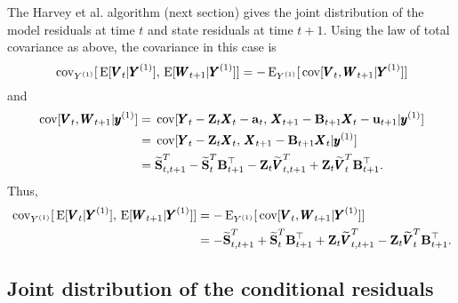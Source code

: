 \documentclass[]{article}
\def\UPS{\mbox{\boldmath $\Upsilon$}}
\def\XI{\mbox{\boldmath $\Xi$}}
\def\BB{\mbox{$\mathbf B$}}	\def\bb{\mbox{$\mathbf b$}} \def\Bb{\mbox{$\mathbf J$}} \def\Ba{\mbox{$\mathbf L$}} \def\Bm{\UPS}
\def\E{\,\textup{\textrm{E}}}
\def\Ss{\mbox{$\mathbf S$}}
\def\VV{\mbox{$\pmb{V}$}}	\def\vv{\mbox{$\pmb{v}$}}
\def\WW{\mbox{$\pmb{W}$}}	\def\ww{\mbox{$\pmb{w}$}}
\def\XX{\mbox{$\pmb{X}$}}	\def\xx{\mbox{$\pmb{x}$}}
\def\YY{\mbox{$\pmb{Y}$}}	\def\yy{\mbox{$\pmb{y}$}}
\def\ZZ{\mbox{$\mathbf Z$}}	\def\zz{\mbox{$\mathbf z$}}	\def\Zb{\mbox{$\mathbf M$}} \def\Za{\mbox{$\mathbf N$}} \def\Zm{\XI}
\def\cov{\,\textup{\textrm{cov}}}
\def\hatVtT{\widetilde{\VV}_t^T}
\def\hatVttpT{\widetilde{\VV}_{t,t+1}^T}
\def\hatStT{\widetilde{\Ss}_t^T}
\def\hatSttpT{\widetilde{\Ss}_{t,t+1}^T}
\begin{document}
The Harvey et al. algorithm (next section) gives the joint distribution of the model residuals at time $t$ and state residuals at time $t+1$.  Using the law of total covariance as above, the covariance in this case is
\begin{equation}
\cov_{Y^{(1)}}[\E[\VV_t|\YY^{(1)}],\E[\WW_{t+1}|\YY^{(1)}]] = - \E_{Y^{(1)}}[ \cov[\VV_t, \WW_{t+1}|\YY^{(1)}] ] 
\end{equation}
and
\begin{equation}
\begin{split}
\cov[\VV_t, \WW_{t+1}|\yy^{(1)}] & =\cov[\YY_t-\ZZ_t\XX_t-\aa_t,\, \XX_{t+1}-\BB_{t+1}\XX_t-\uu_{t+1}|\yy^{(1)}] \\
& =\cov[\YY_t-\ZZ_t\XX_t,\, \XX_{t+1}-\BB_{t+1}\XX_t|\yy^{(1)}] \\
& = \hatSttpT - \hatStT\BB_{t+1}^\top - \ZZ_t\hatVttpT + \ZZ_t \hatVtT \BB_{t+1}^\top .
\end{split}
\end{equation}
Thus,
\begin{equation}
\begin{split}
\cov_{Y^{(1)}}[\E[\VV_t|\YY^{(1)}],\E[\WW_{t+1}|\YY^{(1)}]] & = - \E_{Y^{(1)}}[ \cov[\VV_t, \WW_{t+1}|\YY^{(1)}] ] \\ 
& = - \hatSttpT + \hatStT\BB_{t+1}^\top + \ZZ_t\hatVttpT - \ZZ_t\hatVtT\BB_{t+1}^\top.
\end{split}
\end{equation}


\subsection{Joint distribution of the conditional residuals}
\end{document}
